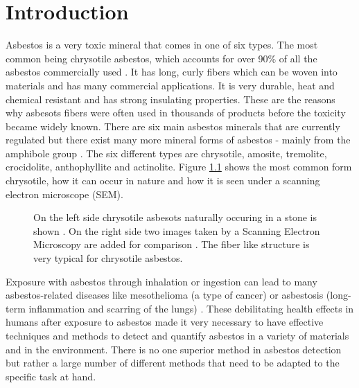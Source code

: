 \chapter{Introduction}

Asbestos is a very toxic mineral that comes in one of six types. The most common being chrysotile asbestos, which accounts for over 90\% of all the asbestos commercially used \cite{asbestosMaacenter}. It has long, curly fibers which can be woven into materials and has many commercial applications. It is very durable, heat and chemical resistant and has strong insulating properties. These are the reasons why asbesots fibers were often used in thousands of products before the toxicity became widely known. There are six main asbestos minerals that are currently regulated but there exist many more mineral forms of asbestos - mainly from the amphibole group \cite{environmental2008framework}. The six different types are chrysotile, amosite, tremolite, crocidolite, anthophyllite and actinolite. Figure \ref{fig:chrysotile} shows the most common form chrysotile, how it can occur in nature and how it is seen under a scanning electron microscope (SEM).

\begin{figure}[h]
\centering
\caption{On the left side chrysotile asbesots naturally occuring in a stone is shown \cite{chrysoltileFullSizeImage}. On the right side two images taken by a Scanning Electron Microscopy are added for comparison \cite{mohammed2015}. The fiber like structure is very typical for chrysotile asbestos.}
\label{fig:chrysotile}
\end{figure}

Exposure with asbestos through inhalation or ingestion can lead to many asbestos-related diseases like mesothelioma (a type of cancer) or asbestosis (long-term inflammation and scarring of the lungs) \cite{asbestosMaacenter, MesotheliomaWiki, asbestosisWiki}. These debilitating health effects in humans after exposure to asbestos made it very necessary to have effective techniques and methods to detect and quantify asbestos in a variety of materials and in the environment. There is no one superior method in asbestos detection but rather a large number of different methods that need to be adapted to the specific task at hand. \\

